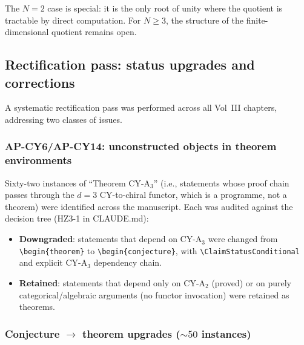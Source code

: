 \documentclass[11pt]{article}
\begin{document}
\noindent The $N = 2$ case is special: it is the only root of unity
where the quotient is tractable by direct computation. For $N \geq 3$,
the structure of the finite-dimensional quotient remains open.


\subsection{Rectification pass: status upgrades and corrections}
\label{subsec:rectification-pass}

A systematic rectification pass was performed across all Vol~III
chapters, addressing two classes of issues.

\subsubsection{AP-CY6/AP-CY14: unconstructed objects in theorem environments}

Sixty-two instances of ``Theorem CY-A$_3$'' (i.e., statements
whose proof chain passes through the $d = 3$ CY-to-chiral functor,
which is a programme, not a theorem) were identified across the
manuscript. Each was audited against the decision tree
(HZ3-1 in CLAUDE.md):
\begin{itemize}
 \item \textbf{Downgraded}: statements that depend on CY-A$_3$
 were changed from \texttt{\textbackslash begin\{theorem\}} to
 \texttt{\textbackslash begin\{conjecture\}}, with
 \texttt{\textbackslash ClaimStatusConditional} and explicit
 CY-A$_3$ dependency chain.
 \item \textbf{Retained}: statements that depend only on CY-A$_2$
 (proved) or on purely categorical/algebraic arguments (no functor
 invocation) were retained as theorems.
\end{itemize}

\subsubsection{Conjecture $\to$ theorem upgrades (${\sim}50$ instances)}
\end{document}
